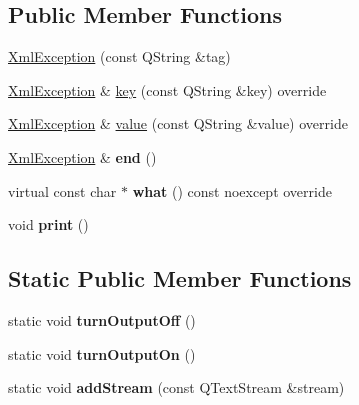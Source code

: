 \subsection*{Public Member Functions}
\begin{DoxyCompactItemize}
\item 
\hyperlink{classXmlException_a912e299d8bfb810f42a2d4c95621b221}{Xml\+Exception} (const Q\+String \&tag)
\item 
\hyperlink{classXmlException}{Xml\+Exception} \& \hyperlink{classXmlException_a6a357f5a13ec354b84fb17ca5b5003a0}{key} (const Q\+String \&key) override
\item 
\hyperlink{classXmlException}{Xml\+Exception} \& \hyperlink{classXmlException_ae51cb72a2a9db85e12409c5e3408ea4d}{value} (const Q\+String \&value) override
\item 
\mbox{\label{classXmlException_a2a1dfe24234debf275fc173ac7c8418e}} 
\hyperlink{classXmlException}{Xml\+Exception} \& {\bfseries end} ()
\item 
\mbox{\label{classXmlException_a4c6857b08997d4bbc147584ade11cc85}} 
virtual const char $\ast$ {\bfseries what} () const noexcept override
\item 
\mbox{\label{classXmlException_ad78827ab05bc42239b2c508637f499c5}} 
void {\bfseries print} ()
\end{DoxyCompactItemize}
\subsection*{Static Public Member Functions}
\begin{DoxyCompactItemize}
\item 
\mbox{\label{classXmlException_a3f8af7698fbadda2967314b5cff33825}} 
static void {\bfseries turn\+Output\+Off} ()
\item 
\mbox{\label{classXmlException_a0bc0cd232f67fcef7ffe0cbd2ceef99d}} 
static void {\bfseries turn\+Output\+On} ()
\item 
\mbox{\label{classXmlException_aed6cfbcbf3cd68112a59194baedf329d}} 
static void {\bfseries add\+Stream} (const Q\+Text\+Stream \&stream)
\end{DoxyCompactItemize}


